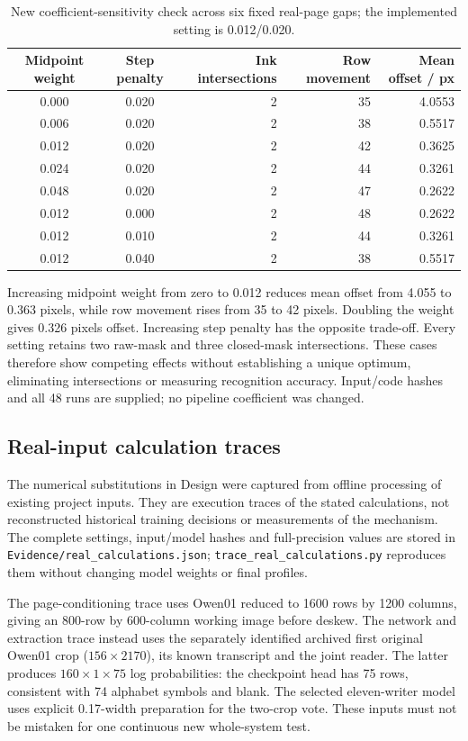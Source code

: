 \begin{table}[!htbp]\centering\small
\begin{tabular}{|c|c|r|r|r|}
\hline Midpoint weight&Step penalty&Ink intersections&Row movement&Mean offset / px\\\hline
0.000&0.020&2&35&4.0553\\\hline
0.006&0.020&2&38&0.5517\\\hline
0.012&0.020&2&42&0.3625\\\hline
0.024&0.020&2&44&0.3261\\\hline
0.048&0.020&2&47&0.2622\\\hline
0.012&0.000&2&48&0.2622\\\hline
0.012&0.010&2&44&0.3261\\\hline
0.012&0.040&2&38&0.5517\\\hline
\end{tabular}
\caption{New coefficient-sensitivity check across six fixed real-page gaps; the implemented setting is 0.012/0.020.}
\label{tab:app-seam-sweep}
\end{table}

Increasing midpoint weight from zero to 0.012 reduces mean offset from 4.055 to 0.363 pixels, while row movement rises from 35 to 42 pixels. Doubling the weight gives 0.326 pixels offset. Increasing step penalty has the opposite trade-off. Every setting retains two raw-mask and three closed-mask intersections. These cases therefore show competing effects without establishing a unique optimum, eliminating intersections or measuring recognition accuracy. Input/code hashes and all 48 runs are supplied; no pipeline coefficient was changed.
\FloatBarrier

\subsection{Real-input calculation traces}\label{app:des-real-calculations}
The numerical substitutions in Design were captured from offline processing of existing project inputs. They are execution traces of the stated calculations, not reconstructed historical training decisions or measurements of the mechanism. The complete settings, input/model hashes and full-precision values are stored in \texttt{Evidence/real\_calculations.json}; \texttt{trace\_real\_calculations.py} reproduces them without changing model weights or final profiles.

The page-conditioning trace uses Owen01 reduced to 1600 rows by 1200 columns, giving an 800-row by 600-column working image before deskew. The network and extraction trace instead uses the separately identified archived first original Owen01 crop ($156\times2170$), its known transcript and the joint reader. The latter produces $160\times1\times75$ log probabilities: the checkpoint head has 75 rows, consistent with 74 alphabet symbols and blank. The selected eleven-writer model uses explicit 0.17-width preparation for the two-crop vote. These inputs must not be mistaken for one continuous new whole-system test.


